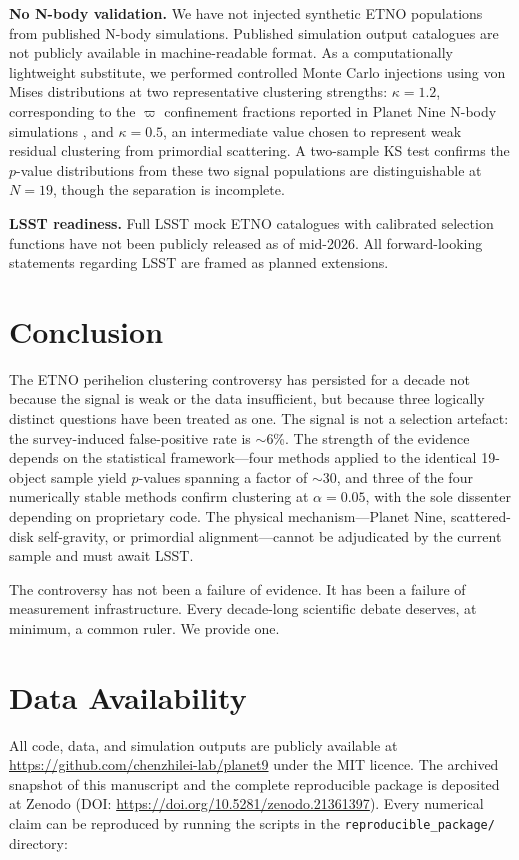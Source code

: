 \documentclass[12pt,a4paper]{article}
\begin{document}
\textbf{No N-body validation.} We have not injected synthetic ETNO populations from published N-body simulations. Published simulation output catalogues are not publicly available in machine-readable format. As a computationally lightweight substitute, we performed controlled Monte Carlo injections using von Mises distributions at two representative clustering strengths: $\kappa=1.2$, corresponding to the $\varpi$ confinement fractions reported in Planet Nine N-body simulations \cite{batygin2019}, and $\kappa=0.5$, an intermediate value chosen to represent weak residual clustering from primordial scattering. A two-sample KS test confirms the $p$-value distributions from these two signal populations are distinguishable at $N=19$, though the separation is incomplete.

\textbf{LSST readiness.} Full LSST mock ETNO catalogues with calibrated selection functions have not been publicly released as of mid-2026. All forward-looking statements regarding LSST are framed as planned extensions.

\section{Conclusion}

The ETNO perihelion clustering controversy has persisted for a decade not because the signal is weak or the data insufficient, but because three logically distinct questions have been treated as one. The signal is not a selection artefact: the survey-induced false-positive rate is $\sim$6\%. The strength of the evidence depends on the statistical framework---four methods applied to the identical 19-object sample yield $p$-values spanning a factor of $\sim$30, and three of the four numerically stable methods confirm clustering at $\alpha=0.05$, with the sole dissenter depending on proprietary code. The physical mechanism---Planet Nine, scattered-disk self-gravity, or primordial alignment---cannot be adjudicated by the current sample and must await LSST.

The controversy has not been a failure of evidence. It has been a failure of measurement infrastructure. Every decade-long scientific debate deserves, at minimum, a common ruler. We provide one.

\section*{Data Availability}
All code, data, and simulation outputs are publicly available at \url{https://github.com/chenzhilei-lab/planet9} under the MIT licence. The archived snapshot of this manuscript and the complete reproducible package is deposited at Zenodo (DOI: \url{https://doi.org/10.5281/zenodo.21361397}). Every numerical claim can be reproduced by running the scripts in the \texttt{reproducible\_package/} directory:
\end{document}
